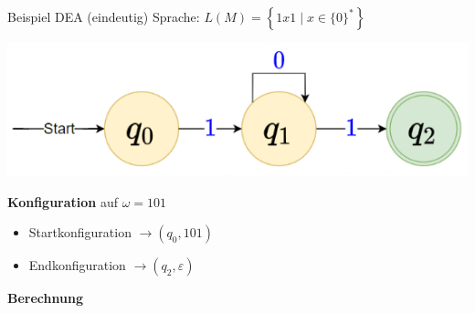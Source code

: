 \begin{example2}{Beispiel DEA (eindeutig)} Sprache: $L(M)=\left\{1 x 1 \mid x \in\{0\}^{*}\right\}$
    
    \begin{minipage}{0.45\linewidth}
        \includegraphics[width=1\linewidth]{images/dea_example.png}
    \end{minipage}
    \hspace{1mm}
    \begin{minipage}{0.5\linewidth}
        \textbf{Konfiguration} auf $\omega=101$
        \begin{itemize}
        \item Startkonfiguration $\rightarrow\left(q_{0}, 101\right)$
        \item Endkonfiguration $\rightarrow\left(q_{2}, \varepsilon\right)$
        \end{itemize}
    \end{minipage}

    \textbf{Berechnung}


\end{example2}

